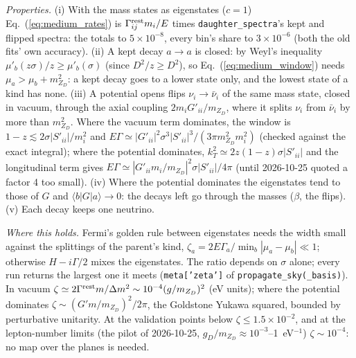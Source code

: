 \documentclass[11pt,a4paper]{article}
\newcommand{\mzd}{m_{Z_D}}
\newcommand{\gd}{g_D}
\begin{document}
\emph{Properties.} (i) With the mass states as eigenstates ($c = 1$) Eq.~(\ref{eq:medium_rates}) is
$\Gamma^{\rm rest}_{ij}m_i/E$ times \texttt{daughter\_spectra}'s kept and flipped spectra: the totals to $5\times10^{-8}$,
every bin's share to $3\times10^{-6}$ (both the old fits' own accuracy). (ii) A kept decay $a\to a$ is closed: by
Weyl's inequality $\mu'_b(z\sigma)/z \ge \mu'_b(\sigma)$ (since $D^2/z \ge D^2$), so Eq.~(\ref{eq:medium_window}) needs
$\mu_a > \mu_b + \mzd^2$: a kept decay goes to a lower state only, and the lowest state of a kind has none. (iii) A
potential opens flips $\nu_i\to\bar\nu_i$ of the same mass state, closed in vacuum, through the axial coupling
$2m_iG'_{ii}/\mzd$, where it splits $\nu_i$ from $\bar\nu_i$ by more than $\mzd^2$. Where the vacuum term dominates,
the window is $1 - z \lesssim 2\sigma|S'_{ii}|/m_i^2$ and
$E\Gamma \simeq |G'_{ii}|^2\sigma^3|S'_{ii}|^3/(3\pi\mzd^2m_i^2)$ (checked against the exact integral); where the
potential dominates, $k_T^2\simeq2z(1-z)\sigma|S'_{ii}|$ and the longitudinal term gives
$E\Gamma\simeq|G'_{ii}m_i/\mzd|^2\sigma|S'_{ii}|/4\pi$ (until 2026-10-25 quoted a factor 4 too small). (iv) Where the potential dominates the eigenstates tend to
those of $G$ and $\langle b|G|a\rangle\to0$: the decays left go through the masses ($\beta$, the flips). (v) Each decay
keeps one neutrino.

\emph{Where this holds.} Fermi's golden rule between eigenstates needs the width small against the splittings of the
parent's kind, $\zeta_a = 2E\Gamma_a/\min_b|\mu_a - \mu_b| \ll 1$; otherwise $H - i\Gamma/2$ mixes the eigenstates. The
ratio depends on $\sigma$ alone; every run returns the largest one it meets (\texttt{meta['zeta']} of \texttt{propagate\_sky(\_basis)}). In vacuum
$\zeta\simeq2\Gamma^{\rm rest}m/\Delta m^2\sim10^{-4}(g/\mzd)^2$ (eV units); where the potential dominates
$\zeta\sim(G'm/\mzd)^2/2\pi$, the Goldstone Yukawa squared, bounded by perturbative unitarity. At the validation
points below $\zeta\le1.5\times10^{-2}$, and at the lepton-number limits (the pilot of 2026-10-25, $\gd/\mzd\approx10^{-3}$--1~eV$^{-1}$) $\zeta\sim10^{-4}$: no map over the planes is needed.
\end{document}
